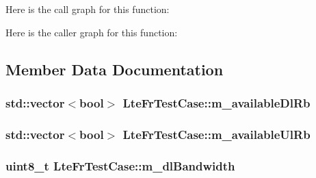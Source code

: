 Here is the call graph for this function\+:




Here is the caller graph for this function\+:




\subsection{Member Data Documentation}
\subsubsection[{\texorpdfstring{m\+\_\+available\+Dl\+Rb}{m_availableDlRb}}]{\setlength{\rightskip}{0pt plus 5cm}std\+::vector$<$bool$>$ Lte\+Fr\+Test\+Case\+::m\+\_\+available\+Dl\+Rb\hspace{0.3cm}{\ttfamily [protected]}}\hypertarget{classLteFrTestCase_a6954d8d3db01c43d27e9ed044abbea45}{}\label{classLteFrTestCase_a6954d8d3db01c43d27e9ed044abbea45}
\subsubsection[{\texorpdfstring{m\+\_\+available\+Ul\+Rb}{m_availableUlRb}}]{\setlength{\rightskip}{0pt plus 5cm}std\+::vector$<$bool$>$ Lte\+Fr\+Test\+Case\+::m\+\_\+available\+Ul\+Rb\hspace{0.3cm}{\ttfamily [protected]}}\hypertarget{classLteFrTestCase_ab3e7226c39c2ef666bbe21d6e6ebbc85}{}\label{classLteFrTestCase_ab3e7226c39c2ef666bbe21d6e6ebbc85}
\subsubsection[{\texorpdfstring{m\+\_\+dl\+Bandwidth}{m_dlBandwidth}}]{\setlength{\rightskip}{0pt plus 5cm}uint8\+\_\+t Lte\+Fr\+Test\+Case\+::m\+\_\+dl\+Bandwidth\hspace{0.3cm}{\ttfamily [protected]}}\hypertarget{classLteFrTestCase_ab4b1f8a24761500e981be4188f37e4a7}{}\label{classLteFrTestCase_ab4b1f8a24761500e981be4188f37e4a7}
